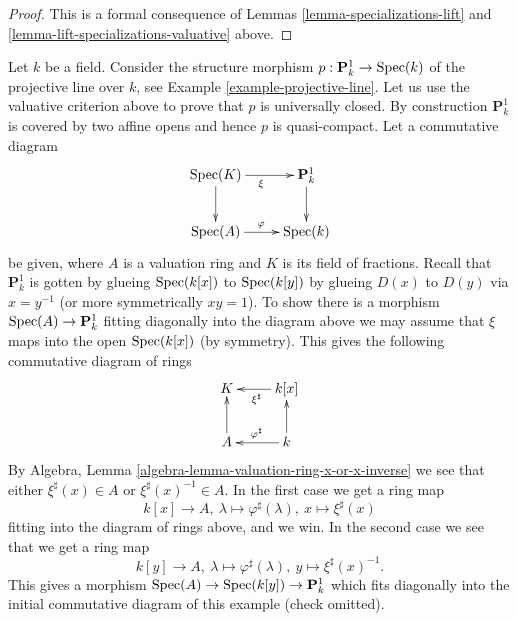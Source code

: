 \begin{proof}
This is a formal consequence of
Lemmas \ref{lemma-specializations-lift} and
\ref{lemma-lift-specializations-valuative} above.
\end{proof}

\begin{example}
\label{example-projective-line-universally-closed}
Let $k$ be a field. Consider the structure morphism
$p : \mathbf{P}^1_k \to \mathop{\mathrm{Spec}}(k)$ of the projective
line over $k$, see Example \ref{example-projective-line}.
Let us use the valuative criterion above to prove that $p$
is universally closed.
By construction $\mathbf{P}^1_k$ is covered by two
affine opens and hence $p$ is quasi-compact.
Let a commutative diagram
$$
\xymatrix{
\Spec(K) \ar[r]_\xi \ar[d] & \mathbf{P}^1_k \ar[d] \\
\Spec(A) \ar[r]^\varphi & \Spec(k)
}
$$
be given, where $A$ is a valuation ring and $K$ is its field
of fractions. Recall that $\mathbf{P}^1_k$ is gotten by glueing
$\mathop{\mathrm{Spec}}(k[x])$ to $\mathop{\mathrm{Spec}}(k[y])$ by glueing
$D(x)$ to $D(y)$ via $x = y^{-1}$ (or more symmetrically $xy = 1$).
To show there is a morphism $\mathop{\mathrm{Spec}}(A) \to \mathbf{P}^1_k$
fitting diagonally into the diagram above we may assume that $\xi$
maps into the open $\mathop{\mathrm{Spec}}(k[x])$ (by symmetry). This gives the following
commutative diagram of rings
$$
\xymatrix{
K & k[x] \ar[l]^{\xi^\sharp} \\
A \ar[u] & k \ar[u] \ar[l]_{\varphi^\sharp}
}
$$
By Algebra, Lemma \ref{algebra-lemma-valuation-ring-x-or-x-inverse}
we see that either
$\xi^\sharp(x) \in A$ or $\xi^\sharp(x)^{-1} \in A$.
In the first case we get a ring map
$$
k[x] \to A,
\ \lambda \mapsto \varphi^\sharp(\lambda),
\  x \mapsto \xi^\sharp(x)
$$
fitting into the diagram of rings above, and we win.
In the second case we see that we get a ring map
$$
k[y] \to A,
\ \lambda \mapsto \varphi^\sharp(\lambda),
\ y \mapsto \xi^\sharp(x)^{-1}.
$$
This gives a morphism
$\mathop{\mathrm{Spec}}(A) \to \mathop{\mathrm{Spec}}(k[y]) \to \mathbf{P}^1_k$
which fits diagonally into the initial commutative diagram of this example
(check omitted).
\end{example}





























